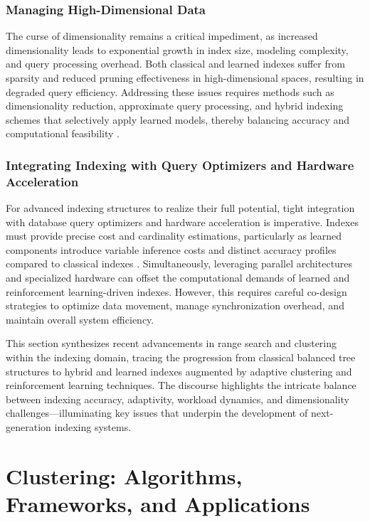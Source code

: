\documentclass[sigconf]{acmart}
\begin{document}
\subsubsection{Managing High-Dimensional Data}

The curse of dimensionality remains a critical impediment, as increased dimensionality leads to exponential growth in index size, modeling complexity, and query processing overhead. Both classical and learned indexes suffer from sparsity and reduced pruning effectiveness in high-dimensional spaces, resulting in degraded query efficiency. Addressing these issues requires methods such as dimensionality reduction, approximate query processing, and hybrid indexing schemes that selectively apply learned models, thereby balancing accuracy and computational feasibility \cite{ref31,ref35}.

\subsubsection{Integrating Indexing with Query Optimizers and Hardware Acceleration}

For advanced indexing structures to realize their full potential, tight integration with database query optimizers and hardware acceleration is imperative. Indexes must provide precise cost and cardinality estimations, particularly as learned components introduce variable inference costs and distinct accuracy profiles compared to classical indexes \cite{ref31,ref34}. Simultaneously, leveraging parallel architectures and specialized hardware can offset the computational demands of learned and reinforcement learning-driven indexes. However, this requires careful co-design strategies to optimize data movement, manage synchronization overhead, and maintain overall system efficiency.

\bigskip

This section synthesizes recent advancements in range search and clustering within the indexing domain, tracing the progression from classical balanced tree structures to hybrid and learned indexes augmented by adaptive clustering and reinforcement learning techniques. The discourse highlights the intricate balance between indexing accuracy, adaptivity, workload dynamics, and dimensionality challenges—illuminating key issues that underpin the development of next-generation indexing systems.

\section{Clustering: Algorithms, Frameworks, and Applications}
\end{document}
